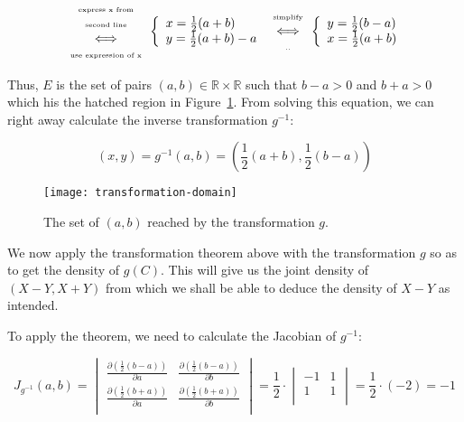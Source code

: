 \documentclass{article}
\newcommand\R{{\mathbb R} }
\begin{document}
$$
\begin{array}{c}\mbox{\tiny express x from}\\\mbox{\tiny second line}\\\Longleftrightarrow\\\mbox{\tiny use expression of x}\end{array}
\left\{\begin{array}{l} x = \frac{1}{2}(a+b)\\y=\frac{1}{2}(a+b)-a\end{array}\right. 
\begin{array}{c}\mbox{\tiny simplify}\\\Longleftrightarrow\\\mbox{\tiny ..}\end{array}
\left\{\begin{array}{l} y=\frac{1}{2}(b-a)\\ x = \frac{1}{2}(a+b)\end{array}\right. 
$$

Thus, $E$ is the set of pairs $(a,b)\in\R\times\R$  such that $b-a>0$ and $b+a>0$ which his the hatched region in Figure~\ref{fig:TransfoDomain}. From solving this equation, we can right away calculate the inverse transformation $g^{-1}$:

$$(x,y) = g^{-1}(a,b) = \left( \frac{1}{2}(a+b), \frac{1}{2}(b-a) \right)$$

\begin{figure}\begin{center}
\texttt{[image: transformation-domain]}\end{center}
\caption{The set of $(a,b)$ reached by the transformation $g$.}\label{fig:TransfoDomain}
\end{figure}

We now apply the transformation theorem above with the transformation $g$ so as to get the density of $g(C)$. This will give us the joint density of $(X-Y,X+Y)$ from which we shall be able to deduce the density of $X-Y$ as intended. 

To apply the theorem, we need to calculate the Jacobian of $g^{-1}$: 

\renewcommand\arraystretch{2}
$$J_{g^{-1}}(a,b) = \begin{vmatrix}
\frac{\partial(\frac{1}{2}(b-a))}{\partial a}       & \frac{\partial(\frac{1}{2}(b-a))}{\partial b}\\
\frac{\partial(\frac{1}{2}(b+a))}{\partial a}       & \frac{\partial(\frac{1}{2}(b+a))}{\partial b}\\
\end{vmatrix} 
= 
\frac{1}{2}\cdot \begin{vmatrix}
-1       & 1 \\
1       & 1\\
\end{vmatrix} = \frac{1}{2}\cdot(-2) = -1$$
\end{document}
